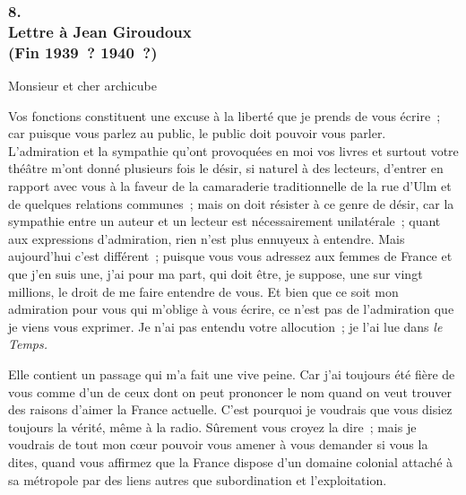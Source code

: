 \documentclass[french,twoside]{book} %
\begin{document}
\subsubsection[8. Lettre à Jean Giroudoux, (Fin 1939 ? 1940 ?)]{8. \\
Lettre à Jean Giroudoux \\
(Fin 1939 ? 1940 ?)}
\noindent \par
Monsieur et cher archicube\par
Vos fonctions constituent une excuse à la liberté que je prends de vous écrire ; car puisque vous parlez au public, le public doit pouvoir vous parler. L'admiration et la sympathie qu'ont provoquées en moi vos livres et surtout votre théâtre m'ont donné plusieurs fois le désir, si naturel à des lecteurs, d'entrer en rapport avec vous à la faveur de la camaraderie traditionnelle de la rue d'Ulm et de quelques relations communes ; mais on doit résister à ce genre de désir, car la sympathie entre un auteur et un lecteur est nécessairement unilatérale ; quant aux expressions d'admiration, rien n'est plus ennuyeux à entendre. Mais aujourd'hui c'est différent ; puisque vous vous adressez aux femmes de France et que j'en suis une, j'ai pour ma part, qui doit être, je suppose, une sur vingt millions, le droit de me faire entendre de vous. Et bien que ce soit mon admiration pour vous qui m'oblige à vous écrire, ce n'est pas de l'admiration que je viens vous exprimer. Je n'ai pas entendu votre allocu­tion ; je l'ai lue dans {\itshape le Temps.}\par
Elle contient un passage qui m'a fait une vive peine. Car j'ai toujours été fière de vous comme d'un de ceux dont on peut prononcer le nom quand on veut trouver des raisons d'aimer la France actuelle. C'est pourquoi je voudrais que vous disiez toujours la vérité, même à la radio. Sûrement vous croyez la dire ; mais je voudrais de tout mon cœur pouvoir vous amener à vous demander si vous la dites, quand vous affirmez que la France dispose d'un domaine colonial attaché à sa métropole par des liens autres que subordination et l'exploitation.\par
\end{document}
